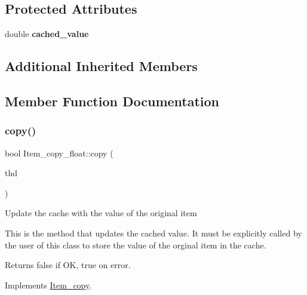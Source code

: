 \subsection*{Protected Attributes}
\begin{DoxyCompactItemize}
\item 
\mbox{\label{classItem__copy__float_a929f870263d510a911c2b9700e60e90c}} 
double {\bfseries cached\+\_\+value}
\end{DoxyCompactItemize}
\subsection*{Additional Inherited Members}


\subsection{Member Function Documentation}
\mbox{\label{classItem__copy__float_a33ef4acb20a062adcc037c1473f79bb0}} 
\subsubsection{\texorpdfstring{copy()}{copy()}}
{\footnotesize\ttfamily bool Item\+\_\+copy\+\_\+float\+::copy (\begin{DoxyParamCaption}\item[{const T\+HD $\ast$}]{thd }\end{DoxyParamCaption})\hspace{0.3cm}{\ttfamily [virtual]}}

Update the cache with the value of the original item

This is the method that updates the cached value. It must be explicitly called by the user of this class to store the value of the orginal item in the cache. \begin{DoxyReturn}{Returns}
false if OK, true on error. 
\end{DoxyReturn}


Implements \mbox{\hyperlink{classItem__copy_a575caec22eeb27fb76d5aa74b1a8d492}{Item\+\_\+copy}}.

\mbox{\label{classItem__copy__float_a02adac943fb28891430337f1b64a7595}} 
